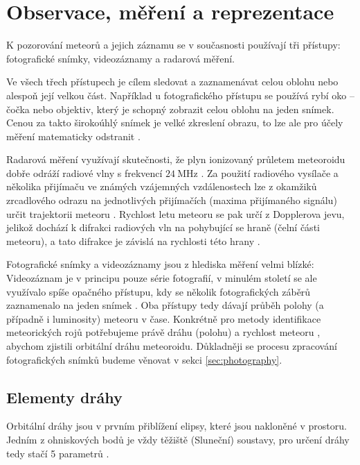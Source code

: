\chapter{Observace, měření a reprezentace}%
K pozorování meteorů a jejich záznamu se v současnosti používají tři přístupy: fotografické snímky, videozáznamy a radarová měření.

Ve všech třech přístupech je cílem sledovat a zaznamenávat celou oblohu nebo alespoň její velkou část. Například u fotografického přístupu se používá rybí oko \cite{ceplecha} -- čočka nebo objektiv, který je schopný zobrazit celou oblohu na jeden snímek. Cenou za takto širokoúhlý snímek je velké zkreslení obrazu, to lze ale pro účely měření matematicky odstranit \cite{ceplecha}.

\smallskip

Radarová měření využívají skutečnosti, že plyn ionizovaný průletem meteoroidu dobře odráží radiové vlny s frekvencí $24\:\text{MHz}$ \cite{radiosurvey}. Za použití radiového vysílače a několika přijímaču ve známých vzájemných vzdálenostech lze z okamžiků zrcadlového odrazu na jednotlivých přijímačích (maxima přijímaného signálu) určit trajektorii meteoru \cite{radiosurvey}. Rychlost letu meteoru se pak určí z Dopplerova jevu, jelikož dochází k difrakci radiových vln na pohybující se hraně (čelní části meteoru), a tato difrakce je závislá na rychlosti této hrany \cite{radiosurvey}.

\smallskip

Fotografické snímky a videozáznamy jsou z hlediska měření velmi blízké: Videozáznam je v principu pouze série fotografií, v minulém století se ale využívalo spíše opačného přístupu, kdy se několik fotografických záběrů zaznamenalo na jeden snímek \cite{ceplecha}. Oba přístupy tedy dávají průběh polohy (a případně i luminosity) meteoru v čase. Konkrétně pro metody identifikace meteorických rojů potřebujeme právě dráhu (polohu) a rychlost meteoru \cite{ceplecha}, abychom zjistili orbitální dráhu meteoroidu. Důkladněji se procesu zpracování fotografických snímků budeme věnovat v sekci \ref{sec:photography}.

\section{Elementy dráhy}\label{sec:orbit}%
Orbitální dráhy jsou v prvním přiblížení elipsy, které jsou nakloněné v prostoru. Jedním z ohniskových bodů je vždy těžiště (Sluneční) soustavy, pro určení dráhy tedy stačí 5 parametrů \cite{astro}.

